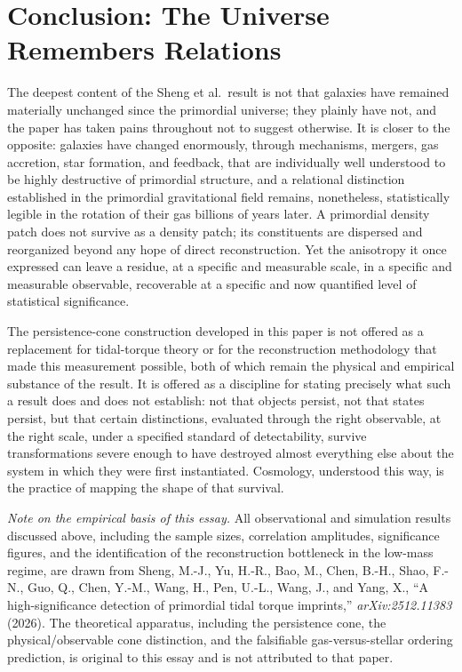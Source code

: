 \documentclass[11pt]{article}
\begin{document}
\section{Conclusion: The Universe Remembers Relations}

The deepest content of the Sheng et al.\ result is not that galaxies have remained materially unchanged since the primordial universe; they plainly have not, and the paper has taken pains throughout not to suggest otherwise. It is closer to the opposite: galaxies have changed enormously, through mechanisms, mergers, gas accretion, star formation, and feedback, that are individually well understood to be highly destructive of primordial structure, and a relational distinction established in the primordial gravitational field remains, nonetheless, statistically legible in the rotation of their gas billions of years later. A primordial density patch does not survive as a density patch; its constituents are dispersed and reorganized beyond any hope of direct reconstruction. Yet the anisotropy it once expressed can leave a residue, at a specific and measurable scale, in a specific and measurable observable, recoverable at a specific and now quantified level of statistical significance.

The persistence-cone construction developed in this paper is not offered as a replacement for tidal-torque theory or for the reconstruction methodology that made this measurement possible, both of which remain the physical and empirical substance of the result. It is offered as a discipline for stating precisely what such a result does and does not establish: not that objects persist, not that states persist, but that certain distinctions, evaluated through the right observable, at the right scale, under a specified standard of detectability, survive transformations severe enough to have destroyed almost everything else about the system in which they were first instantiated. Cosmology, understood this way, is the practice of mapping the shape of that survival.

\bigskip
\noindent\textit{Note on the empirical basis of this essay.} All observational and simulation results discussed above, including the sample sizes, correlation amplitudes, significance figures, and the identification of the reconstruction bottleneck in the low-mass regime, are drawn from Sheng, M.-J., Yu, H.-R., Bao, M., Chen, B.-H., Shao, F.-N., Guo, Q., Chen, Y.-M., Wang, H., Pen, U.-L., Wang, J., and Yang, X., ``A high-significance detection of primordial tidal torque imprints,'' \textit{arXiv:2512.11383} (2026). The theoretical apparatus, including the persistence cone, the physical/observable cone distinction, and the falsifiable gas-versus-stellar ordering prediction, is original to this essay and is not attributed to that paper.
\end{document}
